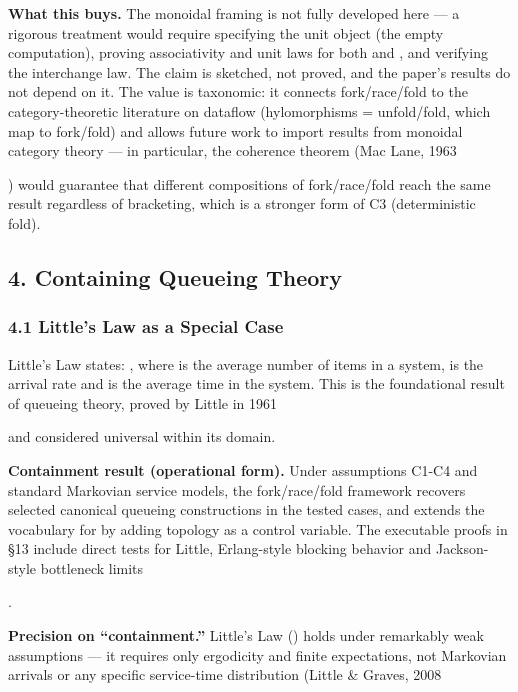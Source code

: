 \documentclass[
]{article}
\begin{document}
\textbf{What this buys.} The monoidal framing is not fully developed
here --- a rigorous treatment would require specifying the unit object
(the empty computation), proving associativity and unit laws for both
and , and verifying the interchange law. The claim is sketched, not
proved, and the paper's results do not depend on it. The value is
taxonomic: it connects fork/race/fold to the category-theoretic
literature on dataflow (hylomorphisms = unfold/fold, which map to
fork/fold) and allows future work to import results from monoidal
category theory --- in particular, the coherence theorem (Mac Lane, 1963

) would guarantee that different compositions of fork/race/fold reach
the same result regardless of bracketing, which is a stronger form of C3
(deterministic fold).

\subsection{\texorpdfstring{\textbf{4. Containing Queueing
Theory}}{4. Containing Queueing Theory}}\label{containing-queueing-theory}

\subsubsection{\texorpdfstring{\textbf{4.1 Little's Law as a Special
Case}}{4.1 Little's Law as a Special Case}}\label{littles-law-as-a-special-case}

Little's Law states: , where is the average number of items in a system,
is the arrival rate and is the average time in the system. This is the
foundational result of queueing theory, proved by Little in 1961

and considered universal within its domain.

\textbf{Containment result (operational form).} Under assumptions C1-C4
and standard Markovian service models, the fork/race/fold framework
recovers selected canonical queueing constructions in the tested cases,
and extends the vocabulary for by adding topology as a control variable.
The executable proofs in §13 include direct tests for Little,
Erlang-style blocking behavior and Jackson-style bottleneck limits

.

\textbf{Precision on ``containment.''} Little's Law () holds under
remarkably weak assumptions --- it requires only ergodicity and finite
expectations, not Markovian arrivals or any specific service-time
distribution (Little \& Graves, 2008
\end{document}
